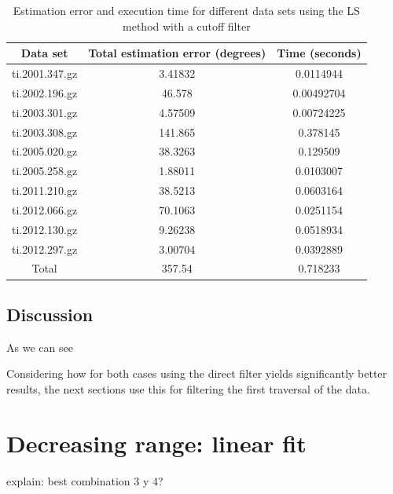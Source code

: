 \begin{table}[h!]
   	\centering
   	\def\arraystretch{1.2}
   	\begin{tabular}{|c c c|} 
   		\hline
   		Data set & Total estimation error (degrees) & Time (seconds) \\ [0.5ex] 
   		\hline\hline
   		ti.2001.347.gz & 3.41832 & 0.0114944 \\
   		\hline
   		ti.2002.196.gz & 46.578 & 0.00492704 \\
   		\hline
   		ti.2003.301.gz & 4.57509 & 0.00724225 \\
   		\hline
   		ti.2003.308.gz & 141.865 & 0.378145 \\
   		\hline
   		ti.2005.020.gz & 38.3263 & 0.129509 \\
   		\hline
   		ti.2005.258.gz & 1.88011 & 0.0103007 \\
   		\hline
   		ti.2011.210.gz & 38.5213 & 0.0603164 \\
   		\hline
   		ti.2012.066.gz & 70.1063 & 0.0251154 \\
   		\hline
   		ti.2012.130.gz & 9.26238 & 0.0518934 \\
   		\hline
   		ti.2012.297.gz & 3.00704 & 0.0392889 \\
   		\hline\hline
   		Total & 357.54 & 0.718233 \\
   		\hline
   	\end{tabular}
   	\caption{Estimation error and execution time for different data sets using the LS method with a cutoff filter}
\end{table}

\subsection{Discussion}

As we can see

Considering how for both cases using the direct filter yields significantly better results, the next sections use this for filtering the first traversal of the data.

\section{Decreasing range: linear fit}

explain: best combination 3 y 4?


